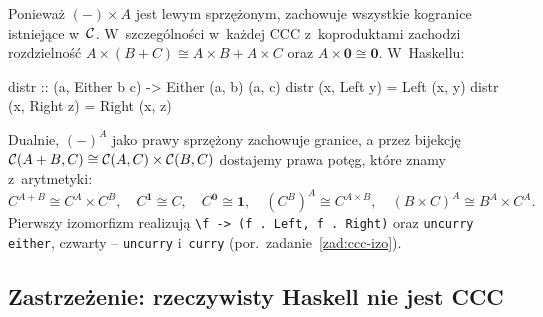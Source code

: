 \begin{przyklad}
Ponieważ $(-)\times A$ jest lewym sprzężonym, zachowuje wszystkie kogranice istniejące w~$\mathcal{C}$. W~szczególności w~każdej CCC z~koproduktami zachodzi rozdzielność $A\times(B+C)\cong A\times B + A\times C$ oraz $A\times\mathbf{0}\cong\mathbf{0}$. W~Haskellu:
\begin{haskell}
distr :: (a, Either b c) -> Either (a, b) (a, c)
distr (x, Left y)  = Left  (x, y)
distr (x, Right z) = Right (x, z)
\end{haskell}
Dualnie, $(-)^A$ jako prawy sprzężony zachowuje granice, a przez bijekcję $\mathcal{C}(A+B, C)\cong\mathcal{C}(A,C)\times\mathcal{C}(B,C)$ dostajemy prawa potęg, które znamy z~arytmetyki:
\[
C^{A+B}\cong C^A\times C^B,\quad C^{\mathbf{1}}\cong C,\quad C^{\mathbf{0}}\cong\mathbf{1},\quad (C^B)^A\cong C^{A\times B},\quad (B\times C)^A\cong B^A\times C^A.
\]
Pierwszy izomorfizm realizują \lstinline{\f -> (f . Left, f . Right)} oraz \lstinline{uncurry either}, czwarty -- \lstinline{uncurry} i~\lstinline{curry} (por.\ zadanie~\ref{zad:ccc-izo}).
\end{przyklad}

\subsection*{Zastrzeżenie: rzeczywisty Haskell nie jest CCC}

